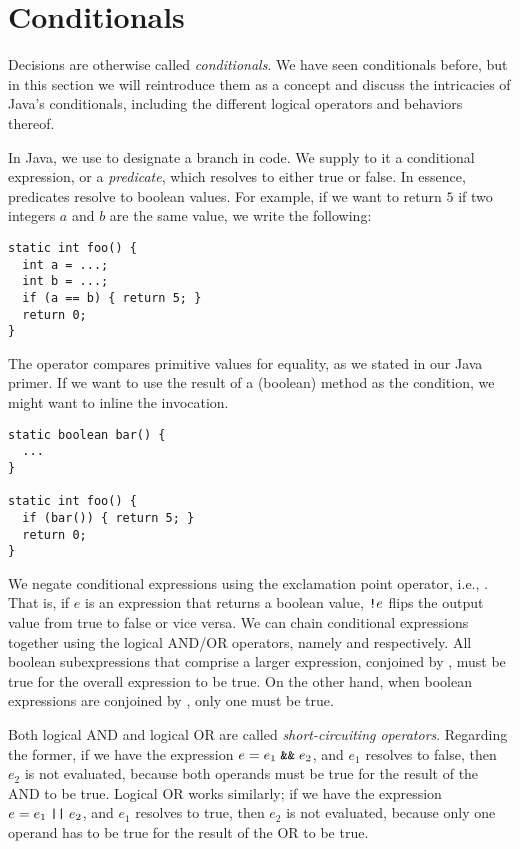 \section{Conditionals}

Decisions are otherwise called \textit{conditionals}. We have seen conditionals before, but in this section we will reintroduce them as a concept and discuss the intricacies of Java's conditionals, including the different logical operators and behaviors thereof.

In Java, we use  to designate a branch in code. We supply to it a conditional expression, or a \textit{predicate}, which resolves to either true or false. In essence, predicates resolve to boolean values. For example, if we want to return $5$ if two integers $a$ and $b$ are the same value, we write the following:
\begin{cl}[]{}
\begin{lstlisting}[language=MyJava]
static int foo() {
  int a = ...;
  int b = ...;
  if (a == b) { return 5; }
  return 0;
}
\end{lstlisting}
\end{cl}
The \ttt{==} operator compares primitive values for equality, as we stated in our Java primer. If we want to use the result of a (boolean) method as the condition, we might want to inline the invocation. 
\begin{cl}[]{}
\begin{lstlisting}[language=MyJava]
static boolean bar() {
  ...
}

static int foo() {
  if (bar()) { return 5; }
  return 0;
}
\end{lstlisting}
\end{cl}
We negate conditional expressions using the exclamation point operator, i.e., \ttt{!}. That is, if $e$ is an expression that returns a boolean value, $\texttt{!} e$ flips the output value from true to false or vice versa. We can chain conditional expressions together using the logical AND/OR operators, namely \ttt{\&\&} and \ttt{||} respectively. All boolean subexpressions that comprise a larger expression, conjoined by \ttt{\&\&}, must be true for the overall expression to be true. On the other hand, when boolean expressions are conjoined by \ttt{||}, only one must be true. 

Both logical AND and logical OR are called \textit{short-circuiting operators}. Regarding the former, if we have the expression $e = e_1 \;\texttt{\&\&}\;e_2$, and $e_1$ resolves to false, then $e_2$ is not evaluated, because both operands must be true for the result of the AND to be true. Logical OR works similarly; if we have the expression $e = e_1\;\texttt{||}\;e_2$, and $e_1$ resolves to true, then $e_2$ is not evaluated, because only one operand has to be true for the result of the OR to be true.

